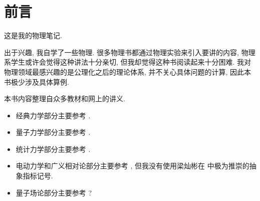 \section*{前言}
这是我的物理笔记. 

出于兴趣, 我自学了一些物理. 很多物理书都通过物理实验来引入要讲的内容, 物理系学生或许会觉得这种讲法十分亲切, 但我却觉得这种书阅读起来十分困难. 我对物理领域最感兴趣的是公理化之后的理论体系, 并不关心具体问题的计算, 因此本书极少涉及具体算例.

本书内容整理自众多教材和网上的讲义.
\begin{itemize}
    \item 经典力学部分主要参考 \cite{arnol2013mathematical}.
    \item 量子力学部分主要参考 \cite{griffiths_schroeter_2018,hall2013quantum}.
    \item 统计力学部分主要参考 \cite{sethna2021statistical}.
    \item 电动力学和广义相对论部分主要参考 \cite{梁灿彬2000微分几何入门与广义相对论}, 但我没有使用梁灿彬在 \cite{梁灿彬2000微分几何入门与广义相对论} 中极为推崇的抽象指标记号.
    \item 量子场论部分主要参考 \cite{lancaster2014quantum}?
\end{itemize}

\newpage
